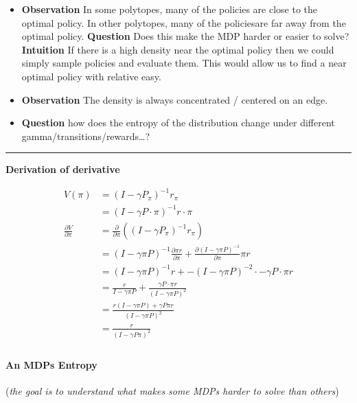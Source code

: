 \begin{itemize}
\item
  \textbf{Observation} In some polytopes, many of the policies are close
  to the optimal policy. In other polytopes, many of the policiesare far
  away from the optimal policy. \textbf{Question} Does this make the MDP
  harder or easier to solve? \textbf{Intuition} If there is a high
  density near the optimal policy then we could simply sample policies
  and evaluate them. This would allow us to find a near optimal policy
  with relative easy.
\item
  \textbf{Observation} The density is always concentrated / centered on
  an edge.
\item
  \textbf{Question} how does the entropy of the distribution change
  under different gamma/transitions/rewards\ldots{}?
\end{itemize}

\begin{center}\rule{0.5\linewidth}{\linethickness}\end{center}

\textbf{Derivation of derivative}

\begin{align}
V(\pi) &= (I − \gamma P_{\pi})^{−1}r_{\pi} \\
&= (I − \gamma P\cdot \pi)^{−1}r\cdot \pi \\
\frac{\partial V}{\partial \pi} &= \frac{\partial}{\partial \pi}((I-\gamma P_{\pi})^{-1} r_{\pi}) \\
&= (I-\gamma \pi P)^{-1} \frac{\partial \pi r}{\partial \pi}+   \frac{\partial (I-\gamma \pi P)^{-1}}{\partial \pi}\pi r\tag{product rule} \\
&= (I-\gamma \pi P)^{-1} r + -(I-\gamma \pi P)^{-2} \cdot -\gamma P\cdot \pi r\\
&= \frac{r}{I-\gamma \pi P} + \frac{ \gamma P\cdot \pi r}{(I-\gamma \pi P)^2}\\
&= \frac{r(I-\gamma \pi P) + \gamma P \pi r}{(I-\gamma \pi P)^2} \\
& = \frac{r}{(I-\gamma P \pi)^2} \\
\end{align}


\paragraph{An MDPs Entropy}

(\emph{the goal is to understand what makes some MDPs harder to solve
than others})

